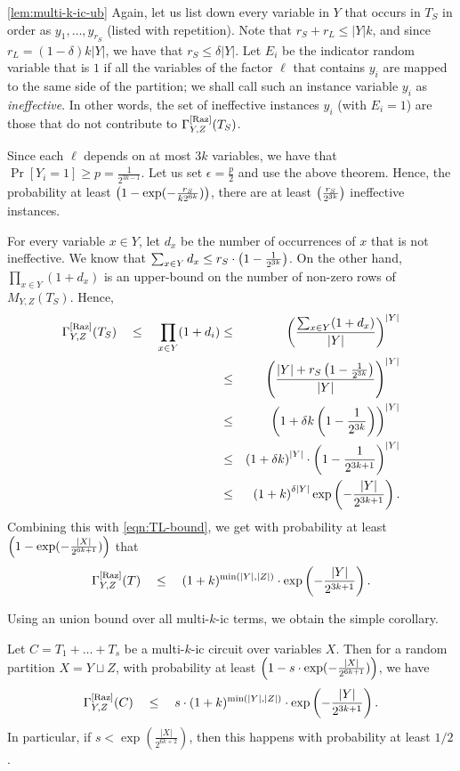 \begin{proofof}{\autoref{lem:multi-k-ic-ub}}
Again, let us list down every variable in $Y$ that occurs in $T_S$ in order as $y_1,\dots, y_{r_S}$ (listed with repetition).
Note that $r_S + r_L \leq |Y|k$, and since $r_L = (1-\delta)k|Y|$,  we have that $r_S \leq \delta |Y|$.
Let $E_i$ be the indicator random variable that is $1$ if all the variables of the factor  $\ell$ that contains $y_i$ are mapped to the same side of the partition; we shall call such an instance variable $y_i$ as \emph{ineffective}.
In other words, the set of ineffective instances $y_i$ (with $E_i = 1$) are those that do not contribute to $\Gamma^{\mathrm{[Raz]}}_{Y,Z}(T_S)$.

Since each $\ell$ depends on at most $3k$ variables, we have that $\Pr[Y_i = 1] \geq  p= \frac{1}{2^{3k-1}}$.
Let us set $\epsilon = \frac{p}{2}$ and use the above theorem.
Hence, the probability at least $\left(1 - \exp(-\frac{r_S}{k2^{6k}})\right)$, there are at least $\left(\frac{r_S}{2^{3k}}\right)$ ineffective instances.

For every variable $x \in Y$, let $d_x$ be the number of occurrences of $x$ that is not ineffective.
We know that $\sum_{x\in Y} d_x \leq r_S \cdot \left(1 - \frac{1}{2^{3k}}\right)$.
On the other hand, $\prod_{x\in Y} (1 + d_x)$ is an upper-bound on the number of non-zero rows of $M_{Y,Z}(T_S)$.
Hence,
\begin{eqnarray*}
\Gamma^{\mathrm{[Raz]}}_{Y,Z}(T_S) \quad \leq \quad\prod_{x\in Y} (1 + d_i) & \leq & \left(\frac{\sum_{x\in Y} (1 + d_x)}{|Y|}\right)^{|Y|}\\
 & \leq & \left(\frac{|Y| + r_S \left(1 - \frac{1}{2^{3k}}\right)}{|Y|}\right)^{|Y|}\\
 & \leq & \left(1 + \delta k\left(1 - \frac{1}{2^{3k}}\right)\right)^{|Y|}\\
 & \leq & \left(1+\delta k\right)^{|Y|} \cdot \left(1 - \frac{1}{2^{3k+1}}\right)^{|Y|}\\
 & \leq & \left(1+k\right)^{\delta |Y|}\exp\left(-\frac{|Y|}{2^{3k+1}}\right).
\end{eqnarray*}
Combining this with \eqref{eqn:TL-bound}, we get with probability at least $\left(1 - \exp(-\frac{|X|}{2^{6k+1}})\right)$ that
\[
\Gamma^{\mathrm{[Raz]}}_{Y,Z}(T) \quad \leq \quad (1+k)^{\min(|Y|,|Z|)}\cdot \exp\left(-\frac{|Y|}{2^{3k+1}}\right).
\]
\end{proofof}

\noindent
Using an union bound over all multi-$k$-ic terms, we obtain the simple corollary.

\begin{corollary}\label{cor:multi-k-ic-ub}
Let $C = T_1 + \dots + T_s$ be a multi-$k$-ic circuit over variables $X$.
Then for a random partition $X = Y \sqcup Z$, with probability at least $\left(1 - s  \cdot \exp(-\frac{|X|}{2^{6k+1}})\right)$, we have
\[
\Gamma^{\mathrm{[Raz]}}_{Y,Z}(C) \quad \leq \quad s \cdot (1+k)^{\min(|Y|,|Z|)}\cdot \exp\left(-\frac{|Y|}{2^{3k+1}}\right).
\]
In particular, if $s < \exp(\frac{|X|}{2^{6k+2}})$, then this happens with probability at least $1/2$.
\end{corollary}

